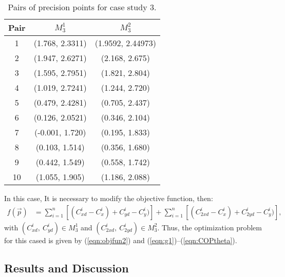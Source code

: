 \documentclass[12pt,letterpape]{article}
\begin{document}
\begin{itemize}
\begin{table}[!ht]
	\centering
	\begin{tabular}{ccc}
			\hline
			Pair  &    $M_{3}^1$    &    $M_{3}^2$      \\
			\hline
			1 & (1.768, 2.3311) & (1.9592, 2.44973) \\
			2 & (1.947, 2.6271) & (2.168, 2.675)    \\
			3 & (1.595, 2.7951) & (1.821, 2.804)    \\
			4 & (1.019, 2.7241) & (1.244, 2.720)    \\
			5 & (0.479, 2.4281) & (0.705, 2.437)    \\
			6 & (0.126, 2.0521) & (0.346, 2.104)    \\
			7 & (-0.001, 1.720) & (0.195, 1.833)    \\
			8 & (0.103, 1.514)  & (0.356, 1.680)    \\
			9 & (0.442, 1.549)  & (0.558, 1.742)    \\
		   10 & (1.055, 1.905)  & (1.186, 2.088)    \\
			\hline
	\end{tabular}
	\caption{Pairs of precision points for case study 3.}
\end{table}
In this case, It is necessary to modify the objective function, then:
\begin{align}
	f(\vec{p}) &= \sum_{i=1}^n \left[ (C_{xd}^i - C_x^i) + C_{yd}^i - C_y^i) \right]
	+ \sum_{i=1}^n \left[ (C_{2xd}^i - C_x^i) + C_{2yd}^i - C_y^i) \right],
	\label{eqn:objfun2}
\end{align}
with $(C_{xd}^i,\ C_{yd}^i) \in M_3^1 $ and $(C_{2xd}^i,\ C_{2yd}^i) \in M_3^2 $.
Thus, the optimization problem for this cased is given by (\ref{eqn:objfun2}) and
 (\ref{eqn:g1})--(\ref{eqn:COPtheta}).

\end{itemize}


\subsection{Results and Discussion} %
\label{sec:results1}
\end{document}
